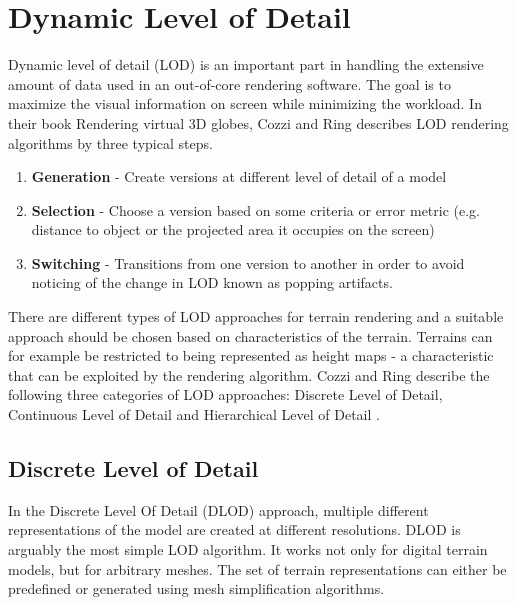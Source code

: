 \section{Dynamic Level of Detail}
Dynamic level of detail (LOD) is an important part in handling the extensive amount of data used in an out-of-core rendering software. The goal is to maximize the visual information on screen while minimizing the workload. In their book Rendering virtual 3D globes, Cozzi and Ring describes LOD rendering algorithms by three typical steps. \cite[p. 367]{cozzi11}

\begin{enumerate}
    \item \textbf{Generation} - Create versions at different level of detail of a model
    \item \textbf{Selection} - Choose a version based on some criteria or error metric (e.g. distance to object or the projected area it occupies on the screen)
    \item \textbf{Switching} - Transitions from one version to another in order to avoid noticing of the change in LOD known as popping artifacts.
\end{enumerate}

There are different types of LOD approaches for terrain rendering and a suitable approach should be chosen based on characteristics of the terrain. Terrains can for example be restricted to being represented as height maps - a characteristic that can be exploited by the rendering algorithm. Cozzi and Ring describe the following three categories of LOD approaches: Discrete Level of Detail, Continuous Level of Detail and Hierarchical Level of Detail \cite[p. 368-371]{cozzi11}.

\subsection{Discrete Level of Detail}
In the Discrete Level Of Detail (DLOD) approach, multiple different representations of the model are created at different resolutions. DLOD is arguably the most simple LOD algorithm. It works not only for digital terrain models, but for arbitrary meshes. The set of terrain representations can either be predefined or generated using mesh simplification algorithms.

